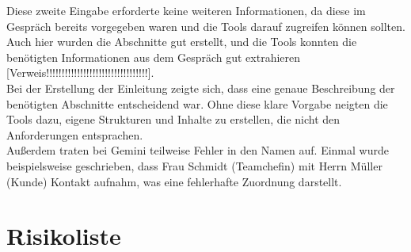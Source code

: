Diese zweite Eingabe erforderte keine weiteren Informationen, da diese im Gespräch bereits vorgegeben waren und die Tools darauf zugreifen 
können sollten. Auch hier wurden die Abschnitte gut erstellt, und die Tools konnten die benötigten Informationen aus dem Gespräch gut 
extrahieren [Verweis!!!!!!!!!!!!!!!!!!!!!!!!!!!!!!!!!].\\

Bei der Erstellung der Einleitung zeigte sich, dass eine genaue Beschreibung der benötigten Abschnitte entscheidend war. Ohne diese klare 
Vorgabe neigten die Tools dazu, eigene Strukturen und Inhalte zu erstellen, die nicht den Anforderungen entsprachen.\\

Außerdem traten bei Gemini teilweise Fehler in den Namen auf. Einmal wurde beispielsweise geschrieben, dass Frau Schmidt (Teamchefin) mit 
Herrn Müller (Kunde) Kontakt aufnahm, was eine fehlerhafte Zuordnung darstellt. %


\section{Risikoliste}  \label{CompRisikoliste}

